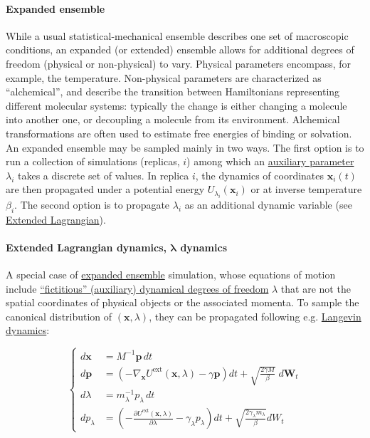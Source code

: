 \documentclass[9pt,review]{livecoms}
\newcommand{\vx}{\mathbf{x}}
\newcommand{\vp}{\mathbf{p}}
\begin{document}
\hypertarget{ref:ExpEns} {\paragraph{Expanded ensemble}}
While a usual statistical-mechanical ensemble describes one set of macroscopic conditions, an expanded (or extended) ensemble allows for additional degrees of freedom (physical or non-physical) to vary. Physical parameters encompass, for example, the temperature. Non-physical parameters are characterized as ``alchemical'', and describe the transition between Hamiltonians representing different molecular systems: typically the change is either changing a molecule into another one, or decoupling a molecule from its environment.
Alchemical transformations are often used to estimate free energies of binding or solvation.
An expanded ensemble may be sampled mainly in two ways.
The first option is to run a collection of simulations (replicas, $i$) among which an \hyperlink{ref:AuxVar} {auxiliary parameter} $\lambda_i$ takes a discrete set of values.
In replica $i$, the dynamics of coordinates $\vx_i(t)$ are then propagated under a potential energy $U_{\lambda_i}(\vx_i)$ or at inverse temperature $\beta_i$.
The second option is to propagate $\lambda_i$ as an additional dynamic variable (see \hyperlink{ref:ExtL} {Extended Lagrangian}).

\hypertarget{ref:ExtL} {\paragraph{Extended Lagrangian dynamics, $\boldsymbol\lambda$ dynamics}}
A special case of \hyperlink{ref:ExpEns} {expanded ensemble} simulation, whose equations of motion include \hyperlink{ref:AuxVar} {``fictitious'' (auxiliary) dynamical degrees of freedom} $\lambda$ that are not the spatial coordinates of physical objects or the associated momenta.
To sample the canonical distribution of $(\vx, \lambda)$, they can be propagated following e.g. \hyperlink{ref:Langevin} {Langevin dynamics}:

\begin{equation}
\left\{
\begin{array}{ll}
d\vx &= M^{-1} \vp \, dt\\
d\vp &= \left(-\nabla_\vx U^\text{ext}(\vx,  \lambda) - \gamma \vp \right) dt
    + \sqrt{ \frac{2 \gamma M}{\beta}} \; d\mathbf{W}_t\\
d\lambda &= m_\lambda^{-1} p_\lambda \, dt \\
dp_\lambda &= \left(-\frac{\partial U^\text{ext}(\vx, \lambda)}{\partial \lambda} - \gamma_\lambda p_\lambda \right) dt
    + \sqrt{ \frac{2 \gamma_\lambda m_\lambda}{ \beta }} dW_t 
\end{array}
\right.
\end{equation}
\end{document}
